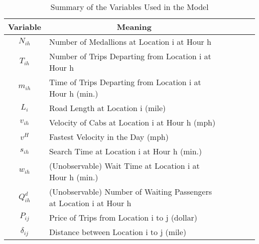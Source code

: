 \begin{table}[h]
\caption{Summary of the Variables Used in the Model}\label{tab:summary_variables}\\

{
\def\sym#1{\ifmmode^{#1}\else\(^{#1}\)\fi}
\begin{center}
\begin{tabular}{l*{5}{l}}
\hline\hline
Variable & \multicolumn{1}{c}{Meaning}\\
\hline
 \multicolumn{1}{c}{$N_{ih}$} & Number of Medallions at Location i at Hour h\\
 \multicolumn{1}{c}{$T_{ih}$} & Number of Trips Departing from Location i at Hour h\\
 \multicolumn{1}{c}{$m_{ih}$} & Time of Trips Departing from Location i at Hour h (min.)\\
 \multicolumn{1}{c}{$L_i$} & Road Length at Location i (mile)\\
 \multicolumn{1}{c}{$v_{ih}$} & Velocity of Cabs at Location i at Hour h (mph)\\
 \multicolumn{1}{c}{$v^H$} & Fastest Velocity in the Day (mph)\\
 \multicolumn{1}{c}{$s_{ih}$} & Search Time at Location i at Hour h (min.)\\
 \multicolumn{1}{c}{$w_{ih}$} & (Unobservable) Wait Time at Location i at Hour h (min.)\\
 \multicolumn{1}{c}{$Q^d_{ih}$} & (Unobservable) Number of Waiting Passengers at Location i at Hour h\\
  \multicolumn{1}{c}{$P_{ij}$} & Price of Trips from Location i to j (dollar)\\
 \multicolumn{1}{c}{$\delta_{ij}$} & Distance between Location i to j (mile)\\

 


\hline\hline
\end{tabular}
\end{center}
}


\end{table}
